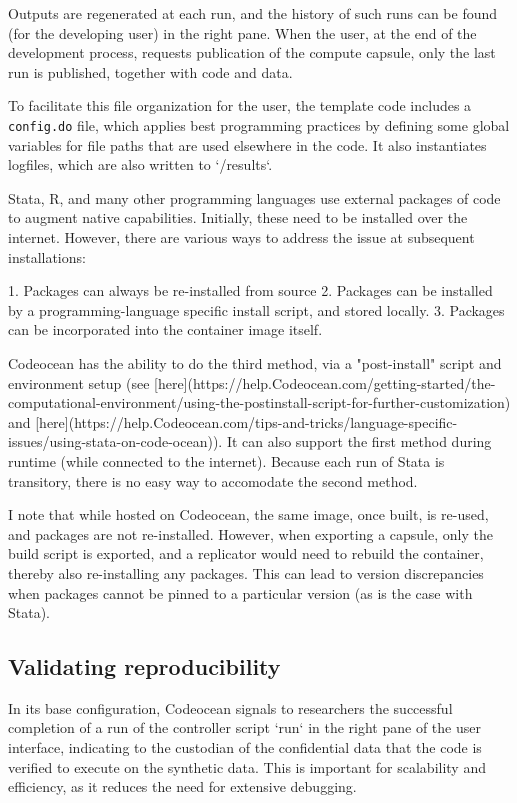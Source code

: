 \documentclass{article}
\begin{document}
Outputs are regenerated at each run, and the history of such runs can be found (for the developing user) in the right pane. When the user, at the end of the development process, requests publication of the compute capsule, only the last run is published, together with code and data.

To facilitate this file organization for the user, the template code includes a \texttt{config.do} file, which applies best programming practices by defining some global variables for file paths that are used elsewhere in the code. It also instantiates logfiles, which are also written to `/results`.



Stata, R, and many other programming languages use external packages of code to augment native capabilities. Initially, these need to be installed over the internet. However, there are various ways to address the issue at subsequent installations:

1. Packages can always be re-installed from source
2. Packages can be installed by a programming-language specific install script, and stored locally. 
3. Packages can be incorporated into the container image itself.

Codeocean has the ability to do the third method, via a "post-install" script and environment setup (see [here](https://help.Codeocean.com/getting-started/the-computational-environment/using-the-postinstall-script-for-further-customization) and [here](https://help.Codeocean.com/tips-and-tricks/language-specific-issues/using-stata-on-code-ocean)). It can also support the first method during runtime (while connected to the internet). Because each run of Stata is transitory, there is no easy way to accomodate the second method. 

I note that while hosted on Codeocean, the same image, once built, is re-used, and packages are not re-installed. However, when exporting a capsule, only the build script is exported, and a replicator would need to rebuild the container, thereby also re-installing any packages. This can lead to version discrepancies when packages cannot be pinned to a particular version (as is the case with Stata). 

\subsection{Validating reproducibility}

In its base configuration, Codeocean signals to researchers the successful completion of a run of the controller script `run` in the right pane of the user interface, indicating to the custodian of the confidential data that the code is verified to execute on the synthetic data. This is important for scalability and efficiency, as it reduces the need for extensive debugging.
\end{document}

